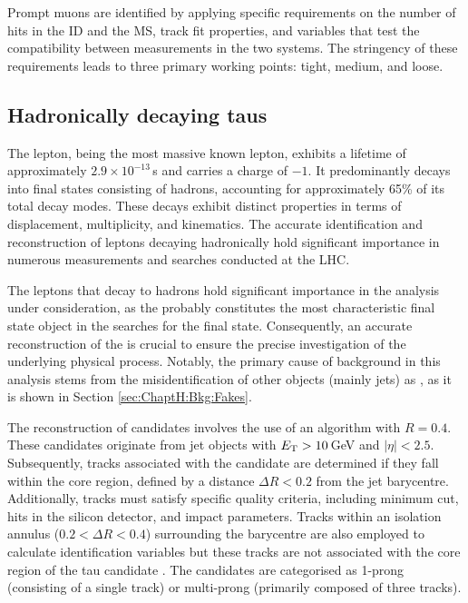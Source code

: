Prompt muons are identified by applying specific requirements on the number of hits in the ID 
and the MS, track fit properties, and variables that test the compatibility between measurements 
in the two systems. The stringency of these requirements leads to three primary working points:
tight, medium, and loose. 



\subsection{Hadronically decaying taus}
\label{sec:Chap3:Reco:Tau}
The \Ptau lepton, being the most massive known lepton, exhibits a lifetime of approximately 
$2.9 \times 10^{-13}\,$s \cite{Belle:2013teo} and carries a charge of $-1$. It predominantly decays into final states 
consisting of hadrons, accounting for approximately 65\% of its total decay modes. 
 These decays exhibit distinct properties in terms of displacement, multiplicity, and kinematics. 
 The accurate identification and reconstruction of \Ptau leptons decaying hadronically hold 
 significant importance in numerous measurements and searches conducted at the LHC.

The \Ptau leptons that decay to hadrons hold significant importance in the analysis under 
consideration, as the \tauhad probably constitutes the most characteristic final state object in the searches 
for the \dileptau final state. Consequently, an accurate reconstruction of the \tauhad is crucial to 
ensure the precise investigation of the underlying physical process. Notably, the primary cause of 
background in this analysis stems from the misidentification of other objects (mainly jets) as \tauhad, as it
is shown in Section \ref{sec:ChaptH:Bkg:Fakes}.

The reconstruction of \tauhad candidates involves the use of an \Akt algorithm\cite{Cacciari:2008gp}
with $R=0.4$. These candidates originate from jet objects with $E_{\text{T}} >10\,$GeV and $|\eta|<2.5$. Subsequently,
tracks associated with the candidate are determined if they fall within the core region, defined by
a distance $\Delta R < 0.2$ from the jet barycentre. Additionally, tracks must satisfy specific 
quality criteria, including minimum \pT cut, hits in the silicon detector, and impact parameters.
Tracks within an isolation annulus ($0.2 < \Delta R < 0.4$) surrounding the barycentre are also 
employed to calculate identification variables but these tracks are not associated with the core region of the tau 
candidate \cite{Leister:1609659}. The \tauhad candidates are categorised as 1-prong 
(consisting of a single track) or
multi-prong (primarily composed of three tracks).

